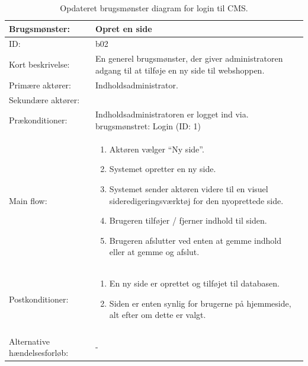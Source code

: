 \begin{table}[H]
    \begin{tabular}{|p{5cm}|p{10cm}|}
        \hline
        Brugsmønster: & Opret en side \\ 
        \hline
        ID: & b02 \\ 
        \hline
        Kort beskrivelse: & En generel brugsmønster, der giver administratoren adgang til at tilføje en ny side til webshoppen. \\ 
        \hline
        Primære aktører: & Indholdsadministrator. \\ 
        \hline
        Sekundære aktører: &  \\ 
        \hline
        Prækonditioner: & Indholdsadministratoren er logget ind via. brugsmønstret: Login (ID: 1) \\ 
        \hline
        Main flow: &    
        \begin{minipage}{10cm}
                \begin{enumerate}
                    \item Aktøren vælger “Ny side”.
                    \item Systemet opretter en ny side.
                    \item Systemet sender aktøren videre til en visuel sideredigeringsværktøj for den nyoprettede side.
                    \item Brugeren tilføjer / fjerner indhold til siden.
                    \item Brugeren afslutter ved enten at gemme indhold eller at gemme og afslut.
        \end{enumerate}
        \end{minipage} \par \\

        \hline
        Postkonditioner: & 
        	\begin{minipage}{10cm}
                \begin{enumerate}
                    \item En ny side er oprettet og tilføjet til databasen.
                    \item Siden er enten synlig for brugerne på hjemmeside, alt efter om dette er valgt.
        		\end{enumerate}
        \end{minipage} \par \\ \\ 
        \hline
        Alternative hændelsesforløb: & - \\ 
        \hline
    \end{tabular}
    \caption{Opdateret brugsmønster diagram for login til CMS.}
    \label{Elab:UC-createPage}
\end{table}

